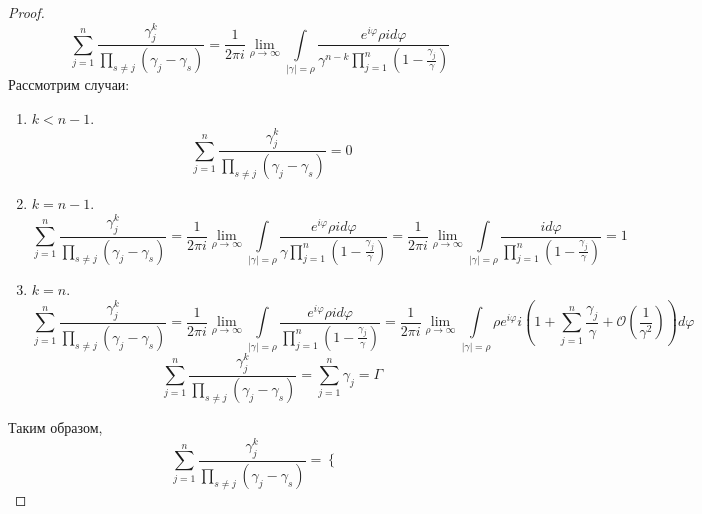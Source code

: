 \documentclass[12pt]{article}
\theoremstyle{definition}
\begin{document}
\begin{itemize}
\begin{proof}
        \begin{equation}
            \sum\limits_{j=1}^n\frac{\gamma_j^k}{\prod\limits_{s\neq j}(\gamma_j-\gamma_s)}=\frac{1}{2\pi i}\lim\limits_{\rho\rightarrow\infty}\int\limits_{|\gamma|=\rho}\frac{e^{i\varphi}\rho id\varphi}{\gamma^{n-k}\prod\limits_{j=1}^n(1-\frac{\gamma_j}{\gamma})}
        \end{equation}
        Рассмотрим случаи:
        \begin{enumerate}
            \item $k<n-1$.
            \begin{equation}
                \sum\limits_{j=1}^n\frac{\gamma_j^k}{\prod\limits_{s\neq j}(\gamma_j-\gamma_s)}=0
            \end{equation}
            \item $k=n-1$.
            \begin{equation*}
                \sum\limits_{j=1}^n\frac{\gamma_j^k}{\prod\limits_{s\neq j}(\gamma_j-\gamma_s)}=\frac{1}{2\pi i}\lim\limits_{\rho\rightarrow\infty}\int\limits_{|\gamma|=\rho}\frac{e^{i\varphi}\rho id\varphi}{\gamma\prod\limits_{j=1}^n(1-\frac{\gamma_j}{\gamma})}=\frac{1}{2\pi i}\lim\limits_{\rho\rightarrow\infty}\int\limits_{|\gamma|=\rho}\frac{id\varphi}{\prod\limits_{j=1}^n(1-\frac{\gamma_j}{\gamma})}=1
            \end{equation*}
            \item $k=n$.
            \begin{equation*}
                \sum\limits_{j=1}^n\frac{\gamma_j^k}{\prod\limits_{s\neq j}(\gamma_j-\gamma_s)}=\frac{1}{2\pi i}\lim\limits_{\rho\rightarrow\infty}\int\limits_{|\gamma|=\rho}\frac{e^{i\varphi}\rho id\varphi}{\prod\limits_{j=1}^n(1-\frac{\gamma_j}{\gamma})}=\frac{1}{2\pi i}\lim\limits_{\rho\rightarrow\infty}\int\limits_{|\gamma|=\rho}\rho e^{i\varphi} i\left(1+\sum\limits_{j=1}^n\frac{\gamma_j}{\gamma}+\mathcal{O}\left(\frac{1}{\gamma^2}\right)\right)d\varphi
            \end{equation*}
            \begin{equation}
                \sum\limits_{j=1}^n\frac{\gamma_j^k}{\prod\limits_{s\neq j}(\gamma_j-\gamma_s)}=\sum\limits_{j=1}^n\gamma_j=\Gamma
            \end{equation}
        \end{enumerate}
        Таким образом,
        \begin{equation}
        \boxed{\sum\limits_{j=1}^n\frac{\gamma_j^k}{\prod\limits_{s\neq j}(\gamma_j-\gamma_s)}=\left\{
        \begin{array}{l}

\end{array}}
\end{equation}
\end{proof}
\end{itemize}
\end{document}
